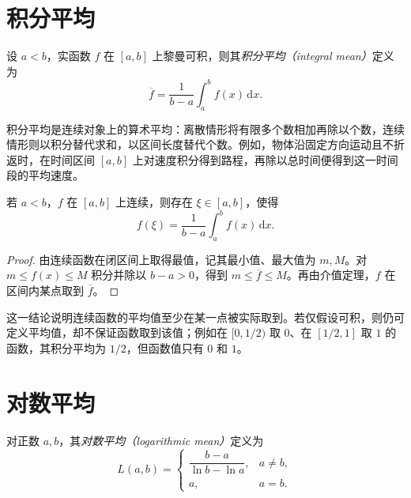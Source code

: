 \documentclass[UTF8,12pt,a4paper,fontset=fandol]{ctexart}
\begin{document}
\section{积分平均}
\label{sec:means-integral}

\begin{definition}
设 $a<b$，实函数 $f$ 在 $[a,b]$ 上黎曼可积，则其\emph{积分平均（integral mean）}定义为
\begin{equation}
\label{eq:means-integral}
  \overline f=\frac{1}{b-a}\int_a^b f(x)\,\mathrm dx.
\end{equation}
\end{definition}

积分平均是连续对象上的算术平均：离散情形将有限多个数相加再除以个数，连续情形则以积分替代求和，以区间长度替代个数。例如，物体沿固定方向运动且不折返时，在时间区间 $[a,b]$ 上对速度积分得到路程，再除以总时间便得到这一时间段的平均速度。

\begin{proposition}[积分平均值定理]
若 $a<b$，$f$ 在 $[a,b]$ 上连续，则存在 $\xi\in[a,b]$，使得
\[
  f(\xi)=\frac{1}{b-a}\int_a^b f(x)\,\mathrm dx.
\]
\end{proposition}

\begin{proof}
由连续函数在闭区间上取得最值，记其最小值、最大值为 $m,M$。对 $m\le f(x)\le M$ 积分并除以 $b-a>0$，得到 $m\le\overline f\le M$。再由介值定理，$f$ 在区间内某点取到 $\overline f$。
\end{proof}

这一结论说明连续函数的平均值至少在某一点被实际取到。若仅假设可积，则仍可定义平均值，却不保证函数取到该值；例如在 $[0,1/2)$ 取 $0$、在 $[1/2,1]$ 取 $1$ 的函数，其积分平均为 $1/2$，但函数值只有 $0$ 和 $1$。

\section{对数平均}
\label{sec:means-logarithmic}

\begin{definition}
对正数 $a,b$，其\emph{对数平均（logarithmic mean）}定义为
\begin{equation}
\label{eq:means-logarithmic}
  L(a,b)=
  \begin{cases}
    \dfrac{b-a}{\ln b-\ln a},&a\ne b,\\
    a,&a=b.
  \end{cases}
\end{equation}
\end{definition}
\end{document}
